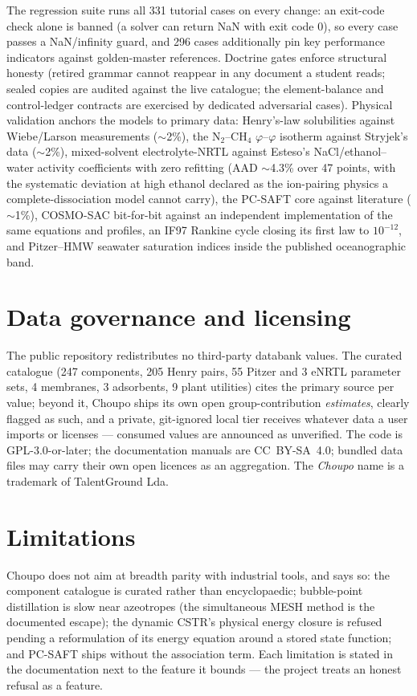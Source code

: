 \documentclass[11pt,a4paper]{article}
\begin{document}
The regression suite runs all 331 tutorial cases on every change: an
exit-code check alone is banned (a solver can return NaN with exit code
0), so every case passes a NaN/infinity guard, and 296 cases additionally
pin key performance indicators against golden-master references.
Doctrine gates enforce structural honesty (retired grammar cannot
reappear in any document a student reads; sealed copies are audited
against the live catalogue; the element-balance and control-ledger
contracts are exercised by dedicated adversarial cases).  Physical
validation anchors the models to primary data: Henry's-law solubilities
against Wiebe/Larson measurements ($\sim$2\%), the N$_2$--CH$_4$
$\varphi$--$\varphi$ isotherm against Stryjek's data ($\sim$2\%),
mixed-solvent electrolyte-NRTL against Esteso's NaCl/ethanol--water
activity coefficients \citep{esteso1989} with zero refitting (AAD
$\sim$4.3\% over 47 points, with the systematic deviation at high
ethanol declared as the ion-pairing physics a complete-dissociation
model cannot carry), the PC-SAFT core against literature ($\sim$1\%),
COSMO-SAC bit-for-bit against an independent implementation of the same
equations and profiles, an IF97 Rankine cycle closing its first law to
$10^{-12}$, and Pitzer--HMW seawater saturation indices inside the
published oceanographic band.

\section{Data governance and licensing}

The public repository redistributes no third-party databank values.  The
curated catalogue (247 components, 205 Henry pairs, 55 Pitzer and 3
eNRTL parameter sets, 4 membranes, 3 adsorbents, 9 plant utilities)
cites the primary source per value; beyond it, Choupo ships its own
open group-contribution \emph{estimates}, clearly flagged as such, and a
private, git-ignored local tier receives whatever data a user imports or
licenses --- consumed values are announced as unverified.  The code is
GPL-3.0-or-later; the documentation manuals are CC~BY-SA~4.0; bundled
data files may carry their own open licences as an aggregation.  The
\emph{Choupo} name is a trademark of TalentGround Lda.

\section{Limitations}

Choupo does not aim at breadth parity with industrial tools, and says so:
the component catalogue is curated rather than encyclopaedic;
bubble-point distillation is slow near azeotropes (the simultaneous MESH
method is the documented escape); the dynamic CSTR's physical energy
closure is refused pending a reformulation of its energy equation around
a stored state function; and PC-SAFT ships without the association term.
Each limitation is stated in the documentation next to the feature it
bounds --- the project treats an honest refusal as a feature.
\end{document}
